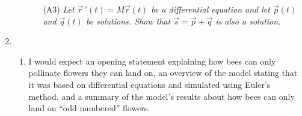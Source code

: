 \begin{enumerate}
\begin{enumerate}
\begin{enumerate}
            \item[(A3)] \emph{Let $\vec r\,'(t)=M\vec r(t)$ be a differential equation and let $\vec p(t)$ and $\vec q(t)$
            be solutions. Show that $\vec s = \vec p+\vec q$ is also a solution.}

            
        \end{enumerate}
    \end{enumerate}

        \item \begin{enumerate}
            \item I would expect an opening statement explaining how bees can only pollinate flowers they can land on,
            an overview of the model stating that it was based on differential equations and simulated using Euler's method,
            and a summary of the model's results about how bees can only land on ``odd numbered'' flowers.


\end{enumerate}
\end{enumerate}
